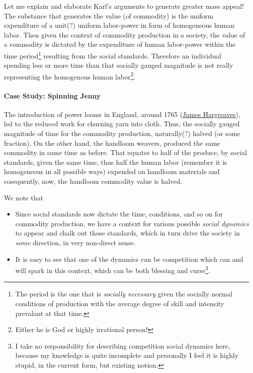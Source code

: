 \documentclass[12pt]{extarticle}
\theoremstyle{definition}
\newenvironment{remark}[1][Remark]{\begin{trivlist}
\item[\hskip \labelsep {\bfseries #1}]}{\end{trivlist}}
\begin{document}
        Let me explain and elaborate Karl's arguments to generate greater mass appeal!  The substance that generates the value (of commodity) is the uniform expenditure of a unit(?) uniform labor-power in form of homogeneous human labor.  Then given the context of commodity production in a society, the value of a commodity is dictated by the expenditure of human labor-power within the time period\footnote{The period is the one that is \emph{socially necessary} given the socially normal conditions of production with the average degree of skill and intensity prevalant at that time.} resulting from the social standards.  Therefore an individual spending less or more time than that socially gauged magnitude is not really representing the homogenous human labor\footnote{Either he is God or highly irrational person!}.

        \paragraph{Case Study: Spinning Jenny}
        The introduction of power looms in England, around 1765 (\href{https://en.wikipedia.org/wiki/James_Hargreaves}{James Hargreaves}), led to the reduced work for churning yarn into cloth.  Thus, the socially gauged magnitude of time for the commodity production, naturally(?) halved (or some fraction).  On the other hand, the handloom weavers, produced the same commodity in same time as before.  That equates to half of the produce, by social standards, given the same time, thus half the human labor (remember it is homogeneous in all possible ways) expended on handloom materials and cosequently, now, the handloom commodity value is halved.

        \begin{remark}
          We note that
          \begin{itemize}
          \item Since social standards now dictate the time, conditions, and so on for commodity production, we have a context for various possible \emph{social dynamics} to appear and chalk out those standards, which in turn drive the society in \emph{some} direction, in very non-direct sense.
            \item It is easy to see that one of the dynamics can be competition which can and will spark in this context, which can be both blessing and curse\footnote{I take no responsibility for describing competition social dynamics here, because my knowledge is quite incomplete and personally I feel it is highly stupid, in the current form, but existing notion.}.
          \end{itemize}
        \end{remark}
\end{document}
